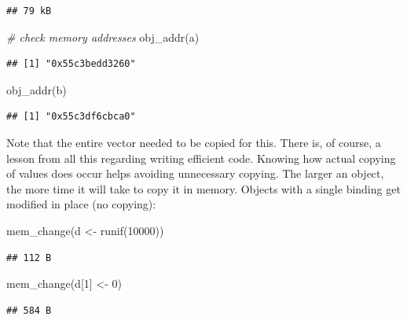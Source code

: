 \documentclass[
  12pt,
]{style/krantz}
\newenvironment{Shaded}{\begin{snugshade}}{\end{snugshade}}
\newcommand{\CommentTok}[1]{\textcolor[rgb]{0.56,0.35,0.01}{\textit{#1}}}
\newcommand{\DecValTok}[1]{\textcolor[rgb]{0.00,0.00,0.81}{#1}}
\newcommand{\FunctionTok}[1]{\textcolor[rgb]{0.00,0.00,0.00}{#1}}
\newcommand{\NormalTok}[1]{#1}
\newcommand{\OtherTok}[1]{\textcolor[rgb]{0.56,0.35,0.01}{#1}}
\begin{document}
\begin{verbatim}
## 79 kB
\end{verbatim}

\begin{Shaded}
\begin{Highlighting}[]
\CommentTok{\# check memory addresses}
\FunctionTok{obj\_addr}\NormalTok{(a)}
\end{Highlighting}
\end{Shaded}

\begin{verbatim}
## [1] "0x55c3bedd3260"
\end{verbatim}

\begin{Shaded}
\begin{Highlighting}[]
\FunctionTok{obj\_addr}\NormalTok{(b)}
\end{Highlighting}
\end{Shaded}

\begin{verbatim}
## [1] "0x55c3df6cbca0"
\end{verbatim}

Note that the entire vector needed to be copied for this. There is, of course, a lesson from all this regarding writing efficient code. Knowing how actual copying of values does occur helps avoiding unnecessary copying. The larger an object, the more time it will take to copy it in memory. Objects with a single binding get modified in place (no copying):

\begin{Shaded}
\begin{Highlighting}[]
\FunctionTok{mem\_change}\NormalTok{(d }\OtherTok{\textless{}{-}} \FunctionTok{runif}\NormalTok{(}\DecValTok{10000}\NormalTok{))}
\end{Highlighting}
\end{Shaded}

\begin{verbatim}
## 112 B
\end{verbatim}

\begin{Shaded}
\begin{Highlighting}[]
\FunctionTok{mem\_change}\NormalTok{(d[}\DecValTok{1}\NormalTok{] }\OtherTok{\textless{}{-}} \DecValTok{0}\NormalTok{)}
\end{Highlighting}
\end{Shaded}

\begin{verbatim}
## 584 B
\end{verbatim}
\end{document}
